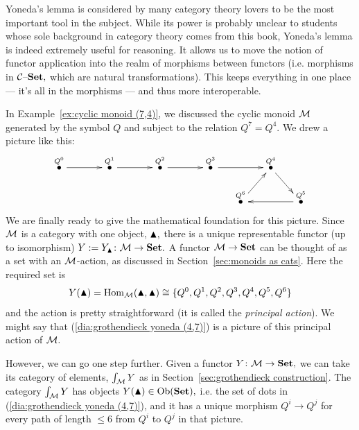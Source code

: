 \documentclass[CT4S-EN-RU]{subfiles}
\begin{document}
\begin{blockENG}
Yoneda's lemma is considered by many category theory lovers to be the most important tool in the subject. While its power is probably unclear to students whose sole background in category theory comes from this book, Yoneda's lemma is indeed extremely useful for reasoning. It allows us to move the notion of functor application into the realm of morphisms between functors (i.e. morphisms in $\mathcal{C}{\text \textendash}{\mathbf{Set}},$ which are natural transformations). This keeps everything in one place — it's all in the morphisms — and thus more interoperable.
\end{blockENG}

\begin{blockRUS}
\end{blockRUS}

\begin{exampleENG}\label{ex:yoneda for cyclic monoid}
In Example~\ref{ex:cyclic monoid (7,4)}, we discussed the cyclic monoid $\mathcal{M}$ generated by the symbol $Q$ and subject to the relation $Q^7=Q^4.$ We drew a picture like this: 
\begin{align}\label{dia:grothendieck yoneda (4,7)}
\xymatrix@=15pt{
\LMO{Q^0}\ar[rr]&&\LMO{Q^1}\ar[rr]&&\LMO{Q^2}\ar[rr]&&\LMO{Q^3}\ar[rr]&&\LMO{Q^4}\ar[dr]\\
&&&&&&&\LMO{Q^6}\ar[ur]&&\LMO{Q^5}\ar[ll]
}
\end{align}
We are finally ready to give the mathematical foundation for this picture. Since $\mathcal{M}$ is a category with one object, $\blacktriangle,$ there is a unique representable functor (up to isomorphism) $Y:=Y_\blacktriangle\colon\mathcal{M}\rightarrow{\mathbf{Set}}.$ A functor $\mathcal{M}\rightarrow{\mathbf{Set}}$ can be thought of as a set with an $\mathcal{M}$-action, as discussed in Section~\ref{sec:monoids as cats}. Here the required set is 
$$Y(\blacktriangle)=\operatorname{Hom}_\mathcal{M}(\blacktriangle,\blacktriangle)\cong\{Q^0,Q^1,Q^2,Q^3,Q^4,Q^5,Q^6\}$$ 
and the action is pretty straightforward (it is called the {\em principal action}). We might say that (\ref{dia:grothendieck yoneda (4,7)}) is a picture of this principal action of $\mathcal{M}.$ 

However, we can go one step further. Given a functor $Y\colon\mathcal{M}\rightarrow{\mathbf{Set}},$ we can take its category of elements, $\int_\mathcal{M} Y$ as in Section~\ref{sec:grothendieck construction}. The category $\int_\mathcal{M} Y$ has objects $Y(\blacktriangle)\in\operatorname{Ob}({\mathbf{Set}}),$ i.e. the set of dots in (\ref{dia:grothendieck yoneda (4,7)}), and it has a unique morphism $Q^i\to Q^j$ for every path of length $\leq 6$ from $Q^i$ to $Q^j$ in that picture.
\end{exampleENG}
\end{document}
